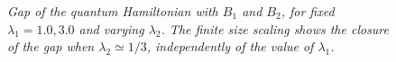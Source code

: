 \documentclass[aps,pra,superscriptaddress]{revtex4}
\renewcommand{\(}{\left(}
\renewcommand{\)}{\right)}
\renewcommand{\[}{\left[}
\renewcommand{\]}{\right]}
\begin{document}
\begin{figure}[H]
\center
{}
\caption{{\em Gap of the quantum Hamiltonian with $B_1$ and $B_2$, for fixed $\lambda_1=1.0,3.0$ and varying $\lambda_2$. The finite size scaling shows the closure of the gap when $\lambda_2 \simeq 1/3$, independently of the value of $\lambda_1$. }}
\label{gap3}
\end{figure}
\end{document}
